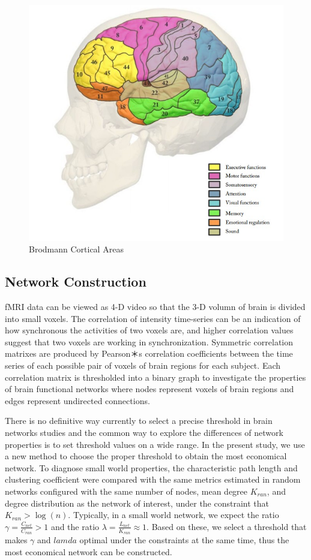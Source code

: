 \documentclass{llncs}
\begin{document}
\begin{figure}[!htbp]
	\centering
		\includegraphics[scale=0.25]{figs/gxj1.jpg}
		\caption{Brodmann Cortical Areas}
    	\label{fig:1}
\end{figure}


\subsection{Network Construction}
fMRI data can be viewed as 4-D video so that the 3-D volumn of brain is divided into small voxels. The correlation of intensity time-series can be an indication of how synchronous the activities of two voxels are, and higher correlation values suggest that two voxels are working in synchronization. Symmetric correlation matrixes are produced by Pearson＊s correlation coefficients between the time series of each possible pair of voxels of brain regions for each subject\cite{13}. Each correlation matrix is thresholded into a binary graph to investigate the properties of brain functional networks where nodes represent voxels of brain regions and edges represent undirected connections.


There is no definitive way currently to select a precise threshold in brain networks studies and the common way to explore the differences of network properties is to set threshold values on a wide range\cite{14,15}. In the present study, we use a new method to choose the proper threshold to obtain the most economical network. To diagnose small world properties, the characteristic path length and clustering coefficient were compared with the same metrics estimated in random networks configured with the same number of nodes, mean degree $K_{ran}$, and degree distribution as the network of interest, under the constraint that $K_{ran} > \log(n)$. Typically, in a small world network, we expect the ratio $\gamma =\frac{C_{net}}{C_{ran}}  >1$ and the ratio $\lambda = \frac{L_{net}}{K_{ran}} \approx 1$\cite{16,17}. Based on these, we select a threshold that makes $\gamma$ and $lamda$ optimal under the constraints at the same time, thus the most economical network can be constructed.
\end{document}
